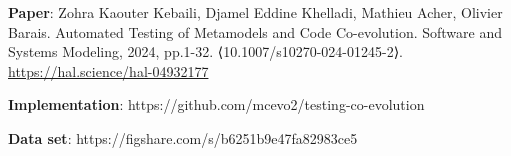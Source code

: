 \begin{myexamplec}
	\small
	\textbf{Paper}: 
	Zohra Kaouter Kebaili, Djamel Eddine Khelladi, Mathieu Acher, Olivier Barais. Automated Testing of Metamodels and Code Co-evolution. Software and Systems Modeling, 2024, pp.1-32. ⟨10.1007/s10270-024-01245-2⟩. %
	\url{https://hal.science/hal-04932177}
	
	\textbf{Implementation}: 
	https://github.com/mcevo2/testing-co-evolution
	
	\textbf{Data set}: https://figshare.com/s/b6251b9e47fa82983ce5
\end{myexamplec}